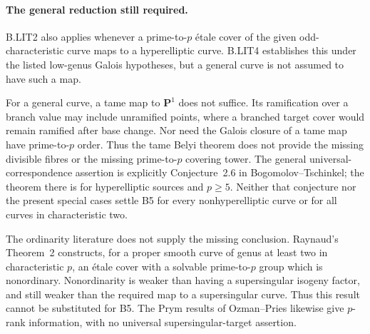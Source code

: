 \paragraph{The general reduction still required.}
B.LIT2 also applies whenever a prime-to-$p$ \'etale cover of the
given odd-characteristic curve maps to a hyperelliptic curve.
B.LIT4 establishes this under the listed low-genus Galois
hypotheses, but a general curve is not assumed to have such a map.

For a general curve, a tame map to $\mathbf P^1$ does not suffice.
Its ramification over a branch value may include unramified points,
where a branched target cover would remain ramified after base
change. Nor need the Galois closure of a tame map have
prime-to-$p$ order. Thus the tame Belyi theorem does not provide
the missing divisible fibres or the missing prime-to-$p$ covering
tower. The general universal-correspondence assertion is explicitly
Conjecture~2.6 in Bogomolov--Tschinkel; the theorem there is for
hyperelliptic sources and $p\ge5$. Neither that conjecture nor the
present special cases settle B5 for every nonhyperelliptic curve
or for all curves in characteristic two.
\citep[Theorem~1.7 and \S3]{LA_Poonen2005}
\citep[Theorem~1.7 and Conjecture~2.6]{LA_BogomolovTschinkel2002}
\citep[Theorem~1.5]{LA_KedlayaLittWitaszek2023}

The ordinarity literature does not supply the missing conclusion.
Raynaud's Theorem~2 constructs, for a proper smooth curve of genus
at least two in characteristic $p$, an \'etale cover with a solvable
prime-to-$p$ group which is nonordinary. Nonordinarity is weaker than
having a supersingular isogeny factor, and still weaker than the
required map to a supersingular curve. Thus this result cannot be
substituted for B5. The Prym results of Ozman--Pries likewise give
$p$-rank information, with no universal supersingular-target assertion.
\citep[Theorem~2]{LA_Raynaud2000}
\citep[Theorem~1.1 and \S8.2]{LA_OzmanPries2019}
